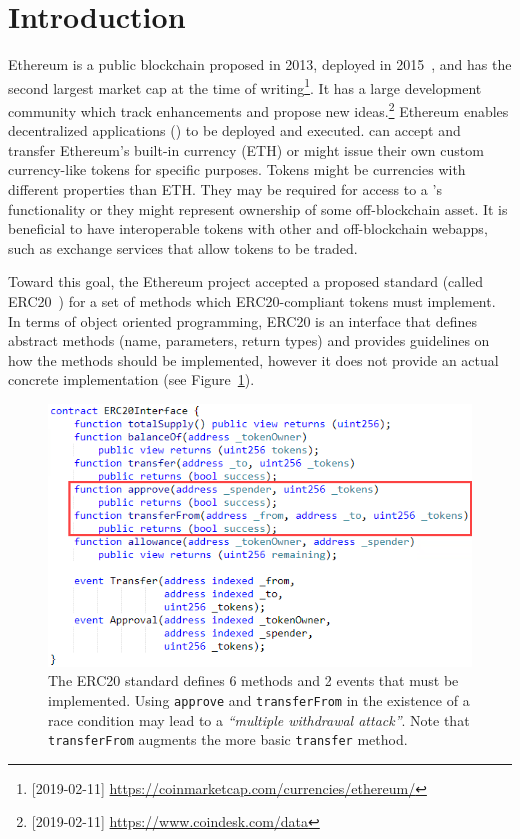 
\section{Introduction}

Ethereum is a public blockchain proposed in 2013, deployed in 2015~\cite{Ref00}, and has the second largest market cap at the time of writing\footnote{[2019-02-11] \url{https://coinmarketcap.com/currencies/ethereum/}}. It has a large development community which track enhancements and propose new ideas.\footnote{[2019-02-11] \url{https://www.coindesk.com/data}} Ethereum enables decentralized applications (\dapps) to be deployed and executed. \dapps can accept and transfer Ethereum's built-in currency (ETH) or might issue their own custom currency-like tokens for specific purposes. Tokens might be currencies with different properties than ETH. They may be required for access to a \dapp's functionality or they might represent ownership of some off-blockchain asset. It is beneficial to have interoperable tokens with other \dapps and off-blockchain webapps, such as exchange services that allow tokens to be traded.

Toward this goal, the Ethereum project accepted a proposed standard (called ERC20~\cite{Ref08}) for a set of methods which ERC20-compliant tokens must implement. In terms of object oriented programming, ERC20 is an interface that defines abstract methods (name, parameters, return types) and provides guidelines on how the methods should be implemented, however it does not provide an actual concrete implementation (see Figure~\ref{fig:erc20api}). 

\begin{figure}[t!]
	\centering
	\includegraphics[width=1.0\linewidth]{figures/multiple_withdrawal_01.png}
	\caption{The ERC20 standard defines 6 methods and 2 events that must be implemented. Using \texttt{approve} and \texttt{transferFrom} in the existence of a race condition may lead to a \textit{``multiple withdrawal attack''}. Note that \texttt{transferFrom} augments the more basic \texttt{transfer} method.}\label{fig:erc20api}
\end{figure}

